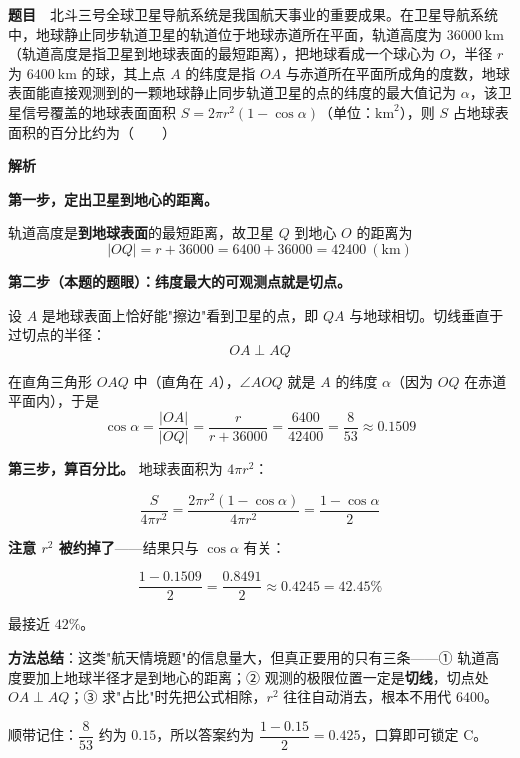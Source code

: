
\textbf{题目}　北斗三号全球卫星导航系统是我国航天事业的重要成果。在卫星导航系统中，地球静止同步轨道卫星的轨道位于地球赤道所在平面，轨道高度为 $36000\ \mathrm{km}$（轨道高度是指卫星到地球表面的最短距离），把地球看成一个球心为 $O$，半径 $r$ 为 $6400\ \mathrm{km}$ 的球，其上点 $A$ 的纬度是指 $OA$ 与赤道所在平面所成角的度数，地球表面能直接观测到的一颗地球静止同步轨道卫星的点的纬度的最大值记为 $\alpha$，该卫星信号覆盖的地球表面面积 $S=2\pi r^{2}(1-\cos\alpha)$（单位：$\mathrm{km}^{2}$），则 $S$ 占地球表面积的百分比约为（　　）

\textbf{解析}

\textbf{第一步，定出卫星到地心的距离。}

轨道高度是\textbf{到地球表面}的最短距离，故卫星 $Q$ 到地心 $O$ 的距离为
\[|OQ|=r+36000=6400+36000=42400\ (\mathrm{km})\]

\textbf{第二步（本题的题眼）：纬度最大的可观测点就是切点。}

设 $A$ 是地球表面上恰好能"擦边"看到卫星的点，即 $QA$ 与地球相切。切线垂直于过切点的半径：
\[OA\perp AQ\]

在直角三角形 $OAQ$ 中（直角在 $A$），$\angle AOQ$ 就是 $A$ 的纬度 $\alpha$（因为 $OQ$ 在赤道平面内），于是
\[\cos\alpha=\frac{|OA|}{|OQ|}=\frac r{r+36000}=\frac{6400}{42400}=\frac{8}{53}\approx0.1509\]

\textbf{第三步，算百分比。} 地球表面积为 $4\pi r^{2}$：

\[\frac S{4\pi r^{2}}=\frac{2\pi r^{2}(1-\cos\alpha)}{4\pi r^{2}}=\frac{1-\cos\alpha}2\]

\textbf{注意 $r^{2}$ 被约掉了}——结果只与 $\cos\alpha$ 有关：

\[\frac{1-0.1509}2=\frac{0.8491}2\approx0.4245=42.45\%\]

最接近 $42\%$。


\begin{gktip}
\textbf{方法总结}：这类"航天情境题"的信息量大，但真正要用的只有三条——① 轨道高度要加上地球半径才是到地心的距离；② 观测的极限位置一定是\textbf{切线}，切点处 $OA\perp AQ$；③ 求"占比"时先把公式相除，$r^{2}$ 往往自动消去，根本不用代 $6400$。

顺带记住：$\dfrac{8}{53}$ 约为 $0.15$，所以答案约为 $\dfrac{1-0.15}2=0.425$，口算即可锁定 C。
\end{gktip}

\par\medskip


